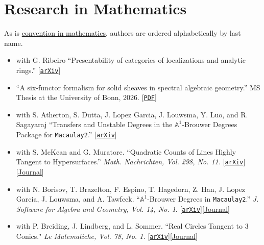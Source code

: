 \documentclass[letterpaper,11pt]{article}
\begin{document}
\section{Research in Mathematics}
\scriptsize{As is \href{https://www.ams.org/profession/leaders/culture/JointResearchandItsPublicationfinal.pdf}{convention in mathematics}, authors are ordered alphabetically by last name.}\normalsize
\begin{itemize}[leftmargin=*]
 \item with G. Ribeiro ``Presentability of categories of localizations and analytic rings.'' [\href{https://arxiv.org/abs/2610.22494}{\texttt{arXiv}}]
 \item ``A six-functor formalism for solid sheaves in spectral algebraic geometry.'' MS Thesis at the University of Bonn, 2026. [\href{https://wgabrielong.github.io/academic-writing/theses/ms-thesis/main.pdf}{\texttt{PDF}}]
 \item with S. Atherton, S. Dutta, J. Lopez Garcia, J. Louwsma, Y. Luo, and R. Sagayaraj ``Transfers and Unstable Degrees in the $\mathbb{A}^{1}$-Brouwer Degrees Package for \texttt{Macaulay2}.'' [\href{https://arxiv.org/abs/2511.12765}{\texttt{arXiv}}]
 \item with S. McKean and G. Muratore. ``Quadratic Counts of Lines Highly Tangent to Hypersurfaces.'' \emph{Math. Nachrichten, Vol. 298, No. 11.}  [\href{https://arxiv.org/abs/2504.21664}{\texttt{arXiv}}][\href{https://doi.org/10.1002/mana.70048}{Journal}]
 \item with N. Borisov, T. Brazelton, F. Espino, T. Hagedorn, Z. Han, J. Lopez Garcia, J. Louwsma, and A. Tawfeek. ``$\mathbb{A}^{1}$-Brouwer Degrees in \texttt{Macaulay2}.'' \emph{J. Software for Algebra and Geometry, Vol. 14, No. 1}. [\href{https://arxiv.org/abs/2312.00106}{\texttt{arXiv}}][\href{https://doi.org/10.2140/jsag.2024.14.175}{Journal}]
 \item with P. Breiding, J. Lindberg, and L. Sommer. ``Real Circles Tangent to 3 Conics." \emph{Le Matematiche, Vol. 78, No. 1.} [\href{https://doi.org/10.48550/arXiv.2211.06876}{\texttt{arXiv}}][\href{https://lematematiche.dmi.unict.it/index.php/lematematiche/article/view/2450}{Journal}]
\end{itemize}
\end{document}
